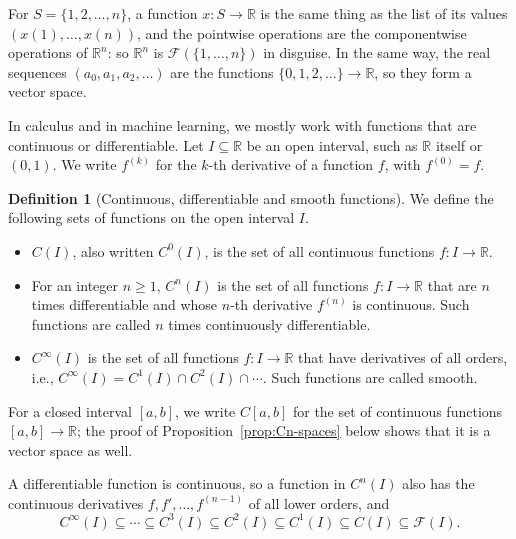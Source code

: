 \documentclass[11pt]{article}
\theoremstyle{definition}
\newtheorem{definition}{Definition}[section]
\theoremstyle{plain}
\theoremstyle{remark}
\begin{document}
For $S = \{1, 2, \ldots, n\}$, a function $x: S \to \mathbb{R}$ is the same thing as the list of its values $(x(1), \ldots, x(n))$, and the pointwise operations are the componentwise operations of $\mathbb{R}^n$: so $\mathbb{R}^n$ is $\mathcal{F}(\{1, \ldots, n\})$ in disguise. In the same way, the real sequences $(a_0, a_1, a_2, \ldots)$ are the functions $\{0, 1, 2, \ldots\} \to \mathbb{R}$, so they form a vector space.

In calculus and in machine learning, we mostly work with functions that are continuous or differentiable. Let $I \subseteq \mathbb{R}$ be an open interval, such as $\mathbb{R}$ itself or $(0, 1)$. We write $f^{(k)}$ for the $k$-th derivative of a function $f$, with $f^{(0)} = f$.

\begin{definition}[Continuous, differentiable and smooth functions]\label{def:Cn}
    We define the following sets of functions on the open interval $I$.
    \begin{itemize}
        \item $C(I)$, also written $C^0(I)$, is the set of all continuous functions $f: I \to \mathbb{R}$.
        \item For an integer $n \geq 1$, $C^n(I)$ is the set of all functions $f: I \to \mathbb{R}$ that are $n$ times differentiable and whose $n$-th derivative $f^{(n)}$ is continuous. Such functions are called $n$ times continuously differentiable.
        \item $C^\infty(I)$ is the set of all functions $f: I \to \mathbb{R}$ that have derivatives of all orders, i.e., $C^\infty(I) = C^1(I) \cap C^2(I) \cap \cdots$. Such functions are called smooth.
    \end{itemize}
    For a closed interval $[a, b]$, we write $C[a, b]$ for the set of continuous functions $[a, b] \to \mathbb{R}$; the proof of Proposition~\ref{prop:Cn-spaces} below shows that it is a vector space as well.
\end{definition}

A differentiable function is continuous, so a function in $C^n(I)$ also has the continuous derivatives $f, f', \ldots, f^{(n-1)}$ of all lower orders, and
\[C^\infty(I) \subseteq \cdots \subseteq C^3(I) \subseteq C^2(I) \subseteq C^1(I) \subseteq C(I) \subseteq \mathcal{F}(I).\]
\end{document}
